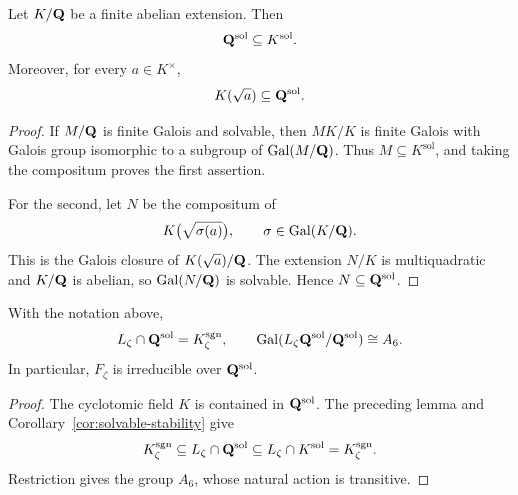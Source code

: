 \begin{lemma}
\label{lem:solvable-closure-comparison}
Let $K/\mathbf Q$ be a finite abelian extension.  Then
\[
 \mathbf Q^{\mathrm{sol}}\subseteq K^{\mathrm{sol}}.
\]
Moreover, for every $a\in K^\times$,
\[
 K(\sqrt a)\subseteq\mathbf Q^{\mathrm{sol}}.
\]
\end{lemma}

\begin{proof}
If $M/\mathbf Q$ is finite Galois and solvable, then $MK/K$ is finite
Galois with Galois group isomorphic to a subgroup of
$\operatorname{Gal}(M/\mathbf Q)$.  Thus $M\subseteq K^{\mathrm{sol}}$, and taking the
compositum proves the first assertion.

For the second, let $N$ be the compositum of
\[
 K\bigl(\sqrt{\sigma(a)}\bigr),
 \qquad \sigma\in\operatorname{Gal}(K/\mathbf Q).
\]
This is the Galois closure of $K(\sqrt a)/\mathbf Q$.  The extension $N/K$
is multiquadratic and $K/\mathbf Q$ is abelian, so $\operatorname{Gal}(N/\mathbf Q)$ is solvable.
Hence $N\subseteq\mathbf Q^{\mathrm{sol}}$.
\end{proof}

\begin{corollary}
\label{cor:Qsol-monodromy}
With the notation above,
\[
 L_\zeta\cap\mathbf Q^{\mathrm{sol}}=K_\zeta^{\mathrm{sgn}},
 \qquad
 \operatorname{Gal}(L_\zeta\mathbf Q^{\mathrm{sol}}/\mathbf Q^{\mathrm{sol}})\cong A_6.
\]
In particular, $F_\zeta$ is irreducible over $\mathbf Q^{\mathrm{sol}}$.
\end{corollary}

\begin{proof}
The cyclotomic field $K$ is contained in $\mathbf Q^{\mathrm{sol}}$.  The
preceding lemma and Corollary~\ref{cor:solvable-stability} give
\[
 K_\zeta^{\mathrm{sgn}}
 \subseteq L_\zeta\cap\mathbf Q^{\mathrm{sol}}
 \subseteq L_\zeta\cap K^{\mathrm{sol}}
 =K_\zeta^{\mathrm{sgn}}.
\]
Restriction gives the group $A_6$, whose natural action is transitive.
\end{proof}
